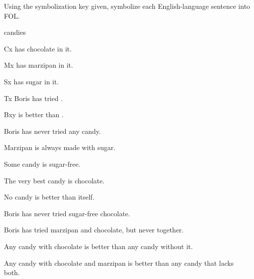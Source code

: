 \problempart
\label{pr.QLcandies}
Using the symbolization key given, symbolize each English-language sentence into FOL.
\begin{ekey}
\item[\text{domain}] candies
\item[Cx]  has chocolate in it.
\item[Mx]  has marzipan in it.
\item[Sx]  has sugar in it.
\item[Tx] Boris has tried .
\item[Bxy]  is better than .
\end{ekey}
\begin{earg}
\item Boris has never tried any candy.
\item Marzipan is always made with sugar.
\item Some candy is sugar-free.
\item The very best candy is chocolate.
\item No candy is better than itself.
\item Boris has never tried sugar-free chocolate.
\item Boris has tried marzipan and chocolate, but never together.
\item Any candy with chocolate is better than any candy without it.
\item Any candy with chocolate and marzipan is better than any candy that lacks both.
\end{earg}

